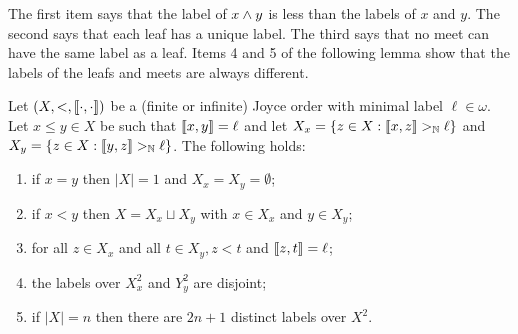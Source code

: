 The first item says that the label of $x \wedge y$ is less than the labels of $x$ and $y$.  The second says that each leaf has a unique label.  The third says that no meet can have the same label as a leaf.  Items 4 and 5 of the following lemma show that the labels of the leafs and meets are always different. 


\begin{lemma}\label{lem:JO-are-trees}
Let $(X,<,\llbracket \cdot , \cdot \rrbracket)$ be a (finite or infinite) Joyce order with minimal label $\ell \in \omega$. Let $x \leq y \in X$ be such that $\llbracket x , y \rrbracket = \ell$ and let $X_x = \{ z \in X: \llbracket x , z \rrbracket >_{\mathbb{N}} \ell \}$
and $X_y = \{ z \in X: \llbracket y , z \rrbracket >_{\mathbb{N}} \ell \}$. The following holds:
\begin{enumerate}
	\item\label{it:JO-are-trees-0} if $x = y$ then $|X| = 1$ and $X_x = X_y = \emptyset$;
	\item\label{it:JO-are-trees-1} if $x < y$ then $X = X_x \sqcup X_y$ with $x \in X_x$ and $y \in X_y$;
	\item\label{it:JO-are-trees-2} for all $z \in X_x$ and all $t \in X_y, z < t$ and $\llbracket z , t \rrbracket = \ell$;
	\item\label{it:JO-are-trees-3} the labels over $X_x^2$ and $Y_y^2$ are disjoint;
	\item\label{it:JO-are-trees-4} if $|X| = n$ then there are $2n+1$ distinct labels over $X^2$.
\end{enumerate}
\end{lemma}
